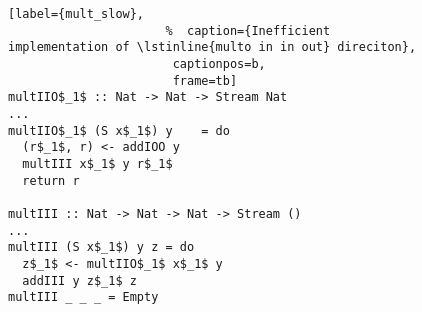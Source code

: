 \begin{figure}[!t]
  \centering
  \begin{minipage}{\columnwidth}
    \begin{lstlisting}[label={mult_slow},
                      %  caption={Inefficient implementation of \lstinline{multo in in out} direciton},
                       captionpos=b,
                       frame=tb]
multIIO$_1$ :: Nat -> Nat -> Stream Nat
...
multIIO$_1$ (S x$_1$) y    = do
  (r$_1$, r) <- addIOO y
  multIII x$_1$ y r$_1$
  return r

multIII :: Nat -> Nat -> Nat -> Stream ()
...
multIII (S x$_1$) y z = do
  z$_1$ <- multIIO$_1$ x$_1$ y
  addIII y z$_1$ z
multIII _ _ _ = Empty
    \end{lstlisting}
  \end{minipage}
\end{figure}
